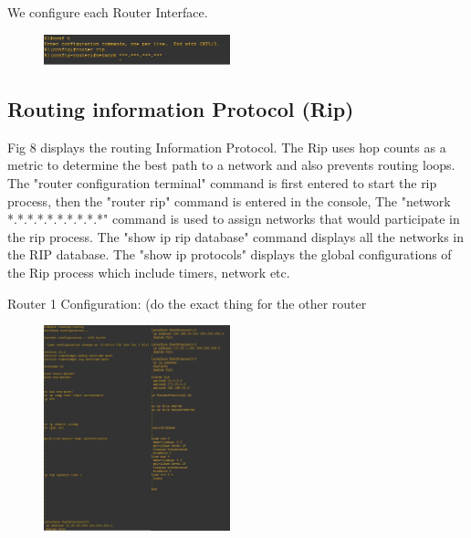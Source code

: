 \documentclass{article}
\begin{document}
We configure each Router Interface.\\


\begin{figure}[H]
	\begin{center}
		\includegraphics[width=0.48\textwidth]{RouterRip.jpg}
	\end{center}
	\caption{\small  \newline}
	\label{fig:Prd}
\end{figure}
\subsection{Routing information Protocol (Rip)} Fig 8 displays the routing Information Protocol. The Rip uses hop counts as a metric to determine the best path to a network and also prevents routing loops. The "router configuration terminal" command is first entered to start the rip process, then the "router rip" command is entered in the console, The "network *.*.*.*.*.*.*.*.*.*" command is used to assign networks that would participate in the rip process. The "show ip rip database" command displays all the networks in the RIP database. The "show ip protocols" displays the global configurations of the Rip process which include timers, network etc.

Router 1 Configuration: (do the exact thing for the other router

\begin{figure}[H]
	\begin{center}
		\includegraphics[width=0.48\textwidth]{Routerconfig.jpg}
	\end{center}
	\caption{\small  \newline}
	\label{fig:Prd}
\end{figure}
\end{document}
